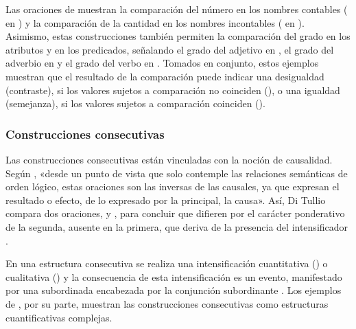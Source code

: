 
Las oraciones de  muestran la comparación del número en los
nombres contables ( en ) y la comparación de
la cantidad en los nombres incontables ( en
). Asimismo, estas construcciones también permiten la
comparación del grado en los atributos y en los predicados, señalando el grado
del adjetivo  en , el grado del adverbio
 en  y el grado del verbo
 en . Tomados en conjunto, estos ejemplos
muestran que el resultado de la comparación puede indicar una desigualdad
(contraste), si los valores sujetos a comparación no coinciden
(), o una igualdad (semejanza), si los valores
sujetos a comparación coinciden ().

\subsubsection{Construcciones consecutivas}\label{sec:13-consecutivas}

Las construcciones consecutivas están vinculadas con la noción de causalidad.
Según \textcite[343]{ditullio2014}, «desde un punto de vista que solo contemple
las relaciones semánticas de orden lógico, estas oraciones son las inversas de
las causales, ya que expresan el resultado o efecto, de lo expresado por la
principal, la causa». Así, Di Tullio compara dos oraciones,  y , para concluir que
difieren por el carácter ponderativo de la segunda, ausente en la primera, que
deriva de la presencia del intensificador .

En una estructura consecutiva se realiza una intensificación cuantitativa
() o cualitativa () y la consecuencia de esta intensificación
es un evento, manifestado por una subordinada encabezada por la conjunción
subordinante . Los ejemplos de , por su parte,
muestran las construcciones consecutivas como estructuras cuantificativas
complejas.

